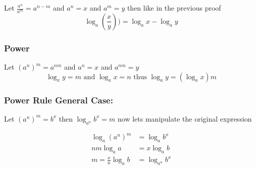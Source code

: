 Let \(\frac{a^n}{a^m} = a^{n - m}\) and \(a^n = x\) and \(a^m = y\) then like in the previous proof
\[
\log_a \left(\frac{x}{y}\right)) = \log_a x - \log_a y
\]
\QED 

\subsubsection{Power}

Let \((a^n)^m = a^{nm}\) and \(a^n = x\) and \(a^{nm} = y\)
\[
\log_x y = m \text{ and } \log_a x = n \text{ thus } \log_a y = (\log_a x )m
\]
\QED

\subsubsection{Power Rule General Case:}

Let \((a^n)^m = b^x\) then \(\log_{a^n} b^x = m\) now lets manipulate the original expression

\begin{align*}
\log_a (a^n)^m &= \log_a b^x\\
nm \log_a a &= x \log_a b\\
m = \frac{x}{n} \log_a b &=  \log_{a^n} b^x 
\end{align*}

\QED
